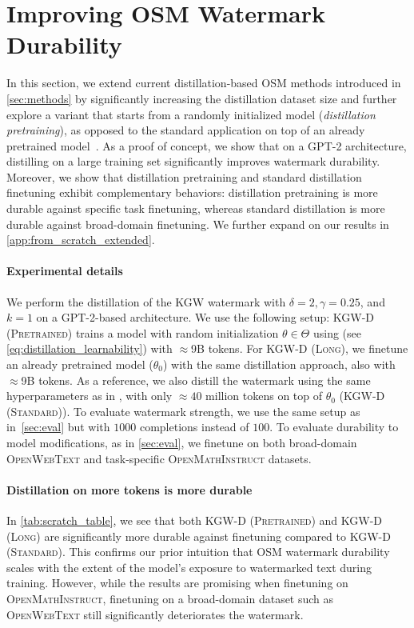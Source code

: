 \section{Improving OSM Watermark Durability}
\label{sec:wm_from_scratch}
 
In this section, we extend current distillation-based OSM methods introduced in \cref{sec:methods} by significantly increasing the distillation dataset size and further explore a variant that starts from a randomly initialized model (\emph{distillation pretraining}), as opposed to the standard application on top of an already pretrained model~\citep{learnability}.
As a proof of concept, we show that on a \textsc{GPT-2} architecture, distilling on a large training set significantly improves watermark durability.
Moreover, we show that distillation pretraining and standard distillation finetuning exhibit complementary behaviors: distillation pretraining is more durable against specific task finetuning, whereas standard distillation is more durable against broad-domain finetuning.
We further expand on our results in \cref{app:from_scratch_extended}.


\paragraph{Experimental details}
We perform the distillation of the \textsc{KGW} watermark with $\delta=2, \gamma=0.25$, and $k=1$ on a \textsc{GPT-2}-based architecture.
We use the following setup: \textsc{KGW-D (Pretrained)} trains a model with random initialization $\theta \in \Theta$ using \citet{learnability} (see \cref{eq:distillation_learnability}) with $\approx$9B tokens.
For \textsc{KGW-D (Long)}, we finetune an already pretrained model ($\theta_0$) with the same distillation approach, also with $\approx$9B tokens.
As a reference, we also distill the watermark using the same hyperparameters as in \citet{learnability}, \ie with only $\approx 40$ million tokens on top of $\theta_0$ (\textsc{KGW-D (Standard)}).
To evaluate watermark strength, we use the same setup as in~\cref{sec:eval} but with $1000$ completions instead of $100$.
To evaluate durability to model modifications, as in \cref{sec:eval}, we finetune on both broad-domain \textsc{OpenWebText} and task-specific \textsc{OpenMathInstruct} datasets.


\paragraph{Distillation on more tokens is more durable}
In \cref{tab:scratch_table}, we see that both \textsc{KGW-D (Pretrained)} and \textsc{KGW-D (Long)} are significantly more durable against finetuning compared to \textsc{KGW-D (Standard)}.
This confirms our prior intuition that OSM watermark durability scales with the extent of the model's exposure to watermarked text during training.
However, while the results are promising when finetuning on \textsc{OpenMathInstruct}, finetuning on a broad-domain dataset such as \textsc{OpenWebText} still significantly deteriorates the watermark.


